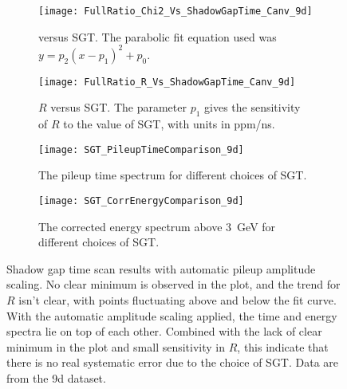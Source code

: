 \begin{figure}
\centering
    \begin{subfigure}[t]{0.45\textwidth}
        \centering
        \texttt{[image: FullRatio\_Chi2\_Vs\_ShadowGapTime\_Canv\_9d]}
        \caption{\chisq versus SGT. The parabolic fit equation used was $y = p_{2}(x - p_{1})^{2} + p_{0}.$}
    \end{subfigure}%
    \hspace{1cm}
    \begin{subfigure}[t]{0.45\textwidth}
        \centering
        \texttt{[image: FullRatio\_R\_Vs\_ShadowGapTime\_Canv\_9d]}
        \caption{$R$ versus SGT. The parameter $p_{1}$ gives the sensitivity of $R$ to the value of SGT, with units in ppm/ns.}
    \end{subfigure}

    \begin{subfigure}[t]{0.45\textwidth}
        \centering
        \texttt{[image: SGT\_PileupTimeComparison\_9d]}
        \caption{The pileup time spectrum for different choices of SGT.}
    \end{subfigure}%
    \hspace{1cm}
    \begin{subfigure}[t]{0.45\textwidth}
        \centering
        \texttt{[image: SGT\_CorrEnergyComparison\_9d]}
        \caption{The corrected energy spectrum above \SI{3}{\GeV} for different choices of SGT.}
    \end{subfigure}
\caption[Pileup shadow gap time scan with automatic pileup amplitude scaling]{Shadow gap time scan results with automatic pileup amplitude scaling. No clear minimum is observed in the \chisq plot, and the trend for $R$ isn't clear, with points fluctuating above and below the fit curve. With the automatic amplitude scaling applied, the time and energy spectra lie on top of each other. Combined with the lack of clear minimum in the \chisq plot and small sensitivity in $R$, this indicate that there is no real systematic error due to the choice of SGT. Data are from the 9d dataset.}
\label{fig:SGTscan}
\end{figure}



